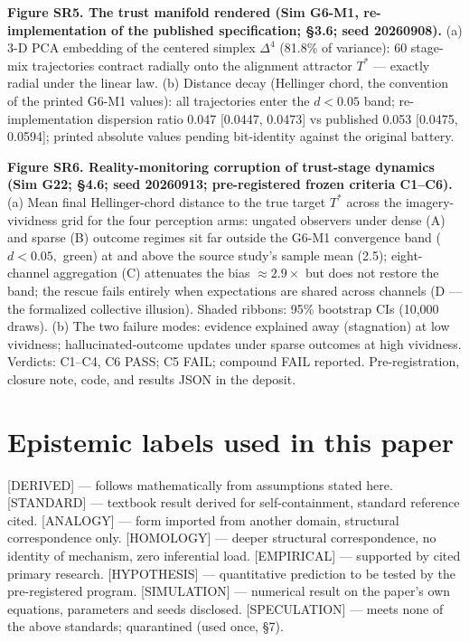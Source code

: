 \documentclass[
]{article}
\newcounter{none} %
\begin{document}
\textbf{Figure SR5. The trust manifold rendered (Sim G6-M1,
re-implementation of the published specification; §3.6; seed 20260908).}
(a) 3-D PCA embedding of the centered simplex \(\Delta^{4}\) (81.8\% of
variance): 60 stage-mix trajectories contract radially onto the
alignment attractor \(T^{*}\) --- exactly radial under the linear law.
(b) Distance decay (Hellinger chord, the convention of the printed G6-M1
values): all trajectories enter the \(d < 0.05\) band; re-implementation
dispersion ratio 0.047 {[}0.0447, 0.0473{]} vs published 0.053
{[}0.0475, 0.0594{]}; printed absolute values pending bit-identity
against the original battery.

\textbf{Figure SR6. Reality-monitoring corruption of trust-stage
dynamics (Sim G22; §4.6; seed 20260913; pre-registered frozen criteria
C1--C6).} (a) Mean final Hellinger-chord distance to the true target
\(T^{*}\) across the imagery-vividness grid for the four perception
arms: ungated observers under dense (A) and sparse (B) outcome regimes
sit far outside the G6-M1 convergence band (\(d < 0.05,\) green) at and
above the source study's sample mean (2.5); eight-channel aggregation
(C) attenuates the bias \(\approx\)\(2.9\times\) but does not restore
the band; the rescue fails entirely when expectations are shared across
channels (D --- the formalized collective illusion). Shaded ribbons:
95\% bootstrap CIs (10,000 draws). (b) The two failure modes: evidence
explained away (stagnation) at low vividness; hallucinated-outcome
updates under sparse outcomes at high vividness. Verdicts: C1--C4, C6
PASS; C5 FAIL; compound FAIL reported. Pre-registration, closure note,
code, and results JSON in the deposit.

\section{Epistemic labels used in this
paper}\label{epistemic-labels-used-in-this-paper}

{[}DERIVED{]} --- follows mathematically from assumptions stated here.
{[}STANDARD{]} --- textbook result derived for self-containment,
standard reference cited. {[}ANALOGY{]} --- form imported from another
domain, structural correspondence only. {[}HOMOLOGY{]} --- deeper
structural correspondence, no identity of mechanism, zero inferential
load. {[}EMPIRICAL{]} --- supported by cited primary research.
{[}HYPOTHESIS{]} --- quantitative prediction to be tested by the
pre-registered program. {[}SIMULATION{]} --- numerical result on the
paper's own equations, parameters and seeds disclosed. {[}SPECULATION{]}
--- meets none of the above standards; quarantined (used once, §7).
\end{document}
